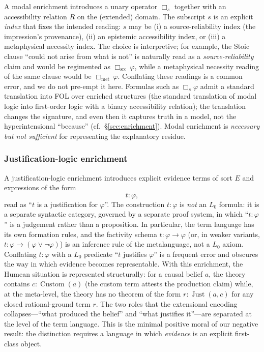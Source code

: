 A modal enrichment introduces a unary operator $\Box_s$ together
with an accessibility relation $R$ on the (extended) domain. The
subscript $s$ is an explicit \emph{index} that fixes the intended
reading: $s$ may be (i) a source-reliability index (the impression's
provenance), (ii) an epistemic accessibility index, or (iii) a
metaphysical necessity index. The choice is interpretive; for
example, the Stoic clause ``could not arise from what is not'' is
naturally read as a \emph{source-reliability} claim and would be
regimented as $\Box_{\mathrm{src}}\,\varphi$, while a metaphysical
necessity reading of the same clause would be $\Box_{\mathrm{met}}\,\varphi$.
Conflating these readings is a common error, and we do not pre-empt
it here. Formulas such as $\Box_s\varphi$ admit a standard
translation into FOL over enriched structures (the standard
translation of modal logic into first-order logic with a binary
accessibility relation); the translation changes the signature, and
even then it captures truth in a model, not the hyperintensional
``because'' (cf.\ \S\ref{sec:enrichment}). Modal enrichment is
\emph{necessary but not sufficient} for representing the
explanatory residue.

\subsubsection{Justification-logic enrichment}
\label{sec:just-enrichment}

A justification-logic enrichment introduces explicit evidence terms
of sort $E$ and expressions of the form
\[
t:\varphi,
\]
read as ``$t$ is a justification for $\varphi$''. The construction
$t:\varphi$ is \emph{not} an $L_0$ formula: it is a separate
syntactic category, governed by a separate proof system, in which
``$t:\varphi$'' is a judgement rather than a proposition. In
particular, the term language has its own formation rules, and the
factivity schema $t:\varphi\rightarrow\varphi$ (or, in weaker
variants, $t:\varphi\rightarrow(\varphi\lor\neg\varphi)$) is an
inference rule of the metalanguage, not a $L_0$ axiom. Conflating
$t:\varphi$ with a $L_0$ predicate ``$t$ justifies $\varphi$'' is a
frequent error and obscures the way in which evidence becomes
representable. With this enrichment, the Humean situation is
represented structurally: for a causal belief $a$, the theory
contains $c:\operatorname{Custom}(a)$ (the custom term attests the
production claim) while, at the meta-level, the theory has no
theorem of the form $r:\operatorname{Just}(a,c)$ for any closed
rational-ground term $r$. The two roles that the extensional
encoding collapses---``what produced the belief'' and ``what
justifies it''---are separated at the level of the term language.
This is the minimal positive moral of our negative result: the
distinction requires a language in which \emph{evidence} is an
explicit first-class object.

